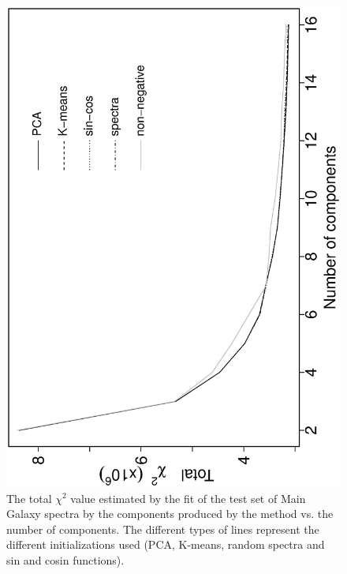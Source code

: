 \documentclass[12pt,preprint]{aastex}
\begin{document}
\clearpage
\begin{figure}
\includegraphics[angle=-90,width=0.49\columnwidth]{paper_plots/fig6}
\caption{The total $\chi^2$ value estimated by the fit of the test set
  of Main Galaxy spectra by the components produced by the method vs. the
  number of components. The different types of lines represent the
  different initializations used (PCA, K-means, random spectra and sin
  and cosin functions).}
\label{fig:4}
\end{figure}
\end{document}
